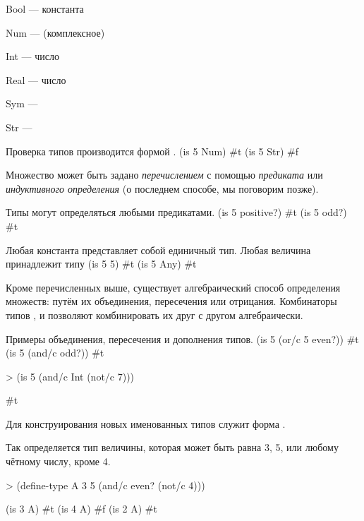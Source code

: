\begin{type}
   \item Bool --- { константа}
   \item Num --- { (комплексное)}
   \item Int --- { число}
   \item Real --- { число}
   \item Sym --- {}
   \item Str --- {}
\end{type}

\begin{example}{%
%
Проверка типов производится формой .}
\REPL
  {(is 5 Num)}
  {#t}
\REPL
  {(is 5 Str)}
  {#f}
\end{example}

\label{set-definition}Множество может быть задано \emph{перечислением} с помощью \emph{предиката} или \emph{индуктивного определения} (о последнем способе, мы поговорим позже).

\begin{example}{%
Типы могут определяться любыми предикатами.}
\REPL
  {(is 5 positive?)}
  {#t}
\REPL
  {(is 5 odd?)}
  {#t}
\end{example}

\begin{example}{%
Любая константа представляет собой единичный тип. Любая величина принадлежит типу }
\REPL
  {(is 5 5)}
  {#t}
\REPL
  {(is 5 Any)}
  {#t}
\end{example}

Кроме перечисленных выше, существует алгебраический способ определения множеств: путём их объединения, пересечения или отрицания. Комбинаторы типов ,  и  позволяют комбинировать их друг с другом алгебраически.

\begin{example}{%
Примеры объединения, пересечения и дополнения типов.}
\REPL
  {(is 5 (or/c 5 even?))}
  {#t}
\REPL
  {(is 5 (and/c  odd?))}
  {#t}
\begin{ExampleCode}
> (is 5 (and/c Int 
               (not/c 7)))
\end{ExampleCode}
\REPLout
  {#t}
\end{example}

Для конструирования новых именованных типов служит форма .

\begin{example}{%
Так определяется тип величины, которая может быть равна 3, 5, или любому чётному числу, кроме 4.}
\begin{ExampleCode}
> (define-type A
    3 
    5 
    (and/c even? 
           (not/c 4)))
\end{ExampleCode}
\REPL
  {(is 3 A)}
  {#t}
\REPL
  {(is 4 A)}
  {#f}
\REPL
  {(is 2 A)}
  {#t}
\end{example}

